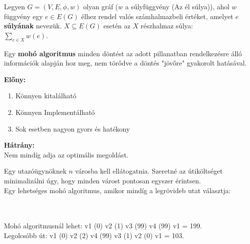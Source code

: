 \begin{frame}
\begin{tcolorbox}[title={Gráf súlya}]
Legyen $G = (V, E, {\phi}, w)$ olyan gráf ($w$ a súlyfüggvény (Az él súlya)), ahol $w$ függvény egy $e \in E(G)$ élhez rendel valós számhalmazbeli értéket, amelyet $e$ \textbf{súlyának} nevezük. $X \subseteq E(G)$ esetén az $X$ részhalmaz súlya:\\
\mmedskip
$\sum_{e \in X} w(e)$.
\end{tcolorbox}

\begin{tcolorbox}[title={Def.: Mohó algoritmus}]
Egy \textbf{mohó algoritmus} minden döntést az adott pillanatban rendelkezésre álló információk alapján hoz meg, nem törődve a döntés "jövőre" gyakorolt hatásával.
\end{tcolorbox}

\begin{tcolorbox}[title={Ész}]
\textbf{Előny:}\\
\mmedskip
\begin{enumerate}
\item Könnyen kitalálható
\item Könnyen Implementálható
\item Sok esetben nagyon gyors és hatékony
\end{enumerate}
\textbf{Hátrány:}\\
Nem mindíg adja az optimális megoldást.
\end{tcolorbox}
\end{frame}


\begin{frame}
\begin{tcolorbox}[title={Ellenpélda: TSP / Travelling Salesman Problem}]
Egy utazóügynöknek $n$ városba kell ellátogatnia. Szeretné az útiköltséget minimalizálni úgy, hogy minden várost pontosan egyszer érintsen.\\
\tcblower
Egy lehetséges mohó algoritmus, amikor mindíg a legrövideb utat választja:\\
\\
\mmedskip
{}
\GraphInit[vstyle=Normal]
\SetVertexSimple[MinSize    = 16pt, LineColor = black, FillColor = mygreen]
\\
\mmedskip
Mohó algoritmusnál lehet: v1 (0) v2 (1) v3 (99) v4 (99) v1 = 199.\\
Legolcsóbb út: v1 (0) v2 (2) v4 (99) v3 (1) v2 (0) v1 = 103.
\end{tcolorbox}
\end{frame}

